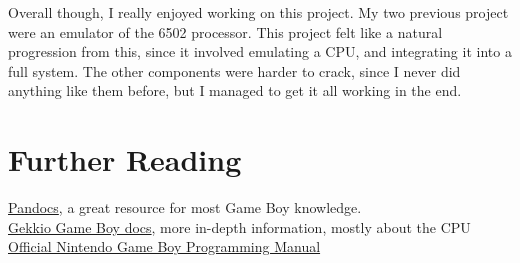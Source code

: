 \documentclass{article}
\begin{document}
        Overall though, I really enjoyed working on this project. My two
        previous project were an emulator of the 6502 processor. This project
        felt like a natural progression from this, since it involved emulating
        a CPU, and integrating it into a full system. The other components were
        harder to crack, since I never did anything like them before, but I
        managed to get it all working in the end.

    \section{Further Reading}\label{sec:furtherReading}
        \href{https://gbdev.io/pandocs/#foreword}{Pandocs}, a great resource for most Game Boy knowledge.\\
        \href{https://gekkio.fi/files/gb-docs/gbctr.pdf}{Gekkio Game Boy docs}, more in-depth information, mostly about the CPU
        \href{https://ia903208.us.archive.org/9/items/GameBoyProgManVer1.1/GameBoyProgManVer1.1.pdf}{Official Nintendo Game Boy Programming Manual}
\end{document}

